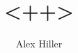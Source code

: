 \documentclass{beamer}
\author{Alex Hiller}
\title{<++>}
\begin{document}
\begin{frame}
    \maketitle
\end{frame}
\end{document}
